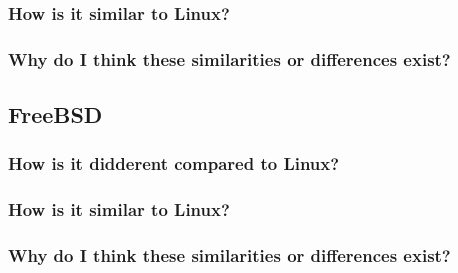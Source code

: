 \documentclass[letterpaper,10pt,draftclsnofoot,onecolumn]{IEEEtran}
\begin{document}
\subsubsection*{How is it similar to Linux?}
\subsubsection*{Why do I think these similarities or differences exist?}

\subsection*{FreeBSD}
\subsubsection*{How is it didderent compared to Linux?}
\subsubsection*{How is it similar to Linux?}
\subsubsection*{Why do I think these similarities or differences exist?}
\end{document}
